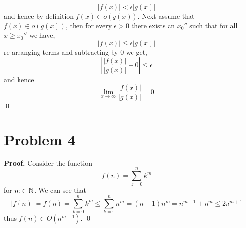 \documentclass[12pt]{report}
\begin{document}
\begin{equation*}
    |f(x)| < \epsilon |g(x)|
\end{equation*}
and hence by definition $f(x) \in o(g(x))$. Next assume that $f(x) \in o(g(x))$, then for every $\epsilon > 0$ there exists an $x_0''$ such that for all $x \geq x_0''$ we have,
\begin{equation*}
    |f(x)| \leq \epsilon |g(x)|
\end{equation*}
re-arranging terms and subtracting by $0$ we get,
\begin{equation*}
    \left| \frac{|f(x)|}{|g(x)|} - 0\right| \leq \epsilon
\end{equation*}
and hence
\begin{equation*}
    \lim_{x \to \infty}  \frac{|f(x)|}{|g(x)|} = 0
\end{equation*} \qed

\section*{Problem 4}
\textbf{Proof.} Consider the function
\begin{equation*}
    f(n) = \sum_{k=0}^n k^m
\end{equation*}
for $m \in \mathbb{N}$. We can see that
\begin{equation*}
    |f(n)| = f(n) =  \sum_{k=0}^n k^m \leq  \sum_{k=0}^n n^m = (n+1)n^m =n^{m+1} + n^m \leq 2n^{m+1}
\end{equation*}
thus $f(n) \in O(n^{m+1})$. \qed
\end{document}
